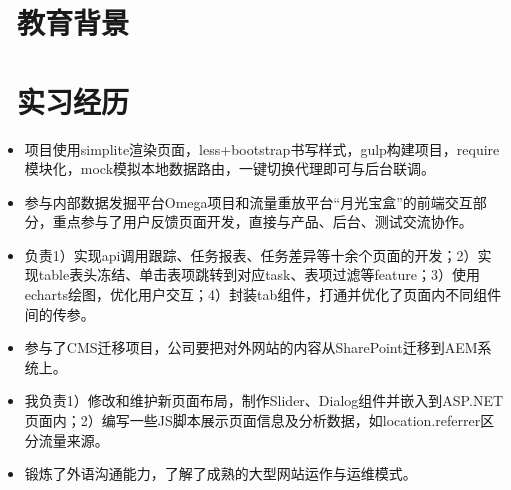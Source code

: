 \documentclass{resume}
\begin{document}



\section{\faGraduationCap\  教育背景}

\section{\faBriefcase\ 实习经历}
\begin{itemize}
  \item 项目使用simplite渲染页面，less+bootstrap书写样式，gulp构建项目，require模块化，mock模拟本地数据路由，一键切换代理即可与后台联调。
  \item 参与内部数据发掘平台Omega项目和流量重放平台“月光宝盒”的前端交互部分，重点参与了用户反馈页面开发，直接与产品、后台、测试交流协作。
  \item 负责1）实现api调用跟踪、任务报表、任务差异等十余个页面的开发；2）实现table表头冻结、单击表项跳转到对应task、表项过滤等feature；3）使用echarts绘图，优化用户交互；4）封装tab组件，打通并优化了页面内不同组件间的传参。
\end{itemize}

\begin{itemize}
  \item 参与了CMS迁移项目，公司要把对外网站的内容从SharePoint迁移到AEM系统上。
  \item 我负责1）修改和维护新页面布局，制作Slider、Dialog组件并嵌入到ASP.NET页面内；2）编写一些JS脚本展示页面信息及分析数据，如location.referrer区分流量来源。
  \item 锻炼了外语沟通能力，了解了成熟的大型网站运作与运维模式。
\end{itemize}
\end{document}
